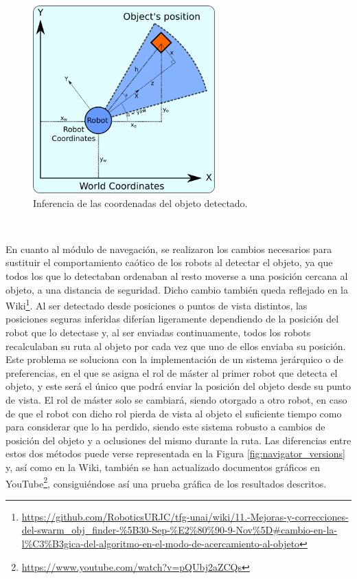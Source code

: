\begin{figure} [h!]
  \begin{center}
    \includegraphics[width=7cm]{figs/coordinates_scheme}
  \end{center}
  \caption{Inferencia de las coordenadas del objeto detectado.}
  \label{fig:coords_infer}
\end{figure}\

En cuanto al módulo de navegación, se realizaron los cambios necesarios para
sustituir el comportamiento caótico de los robots al detectar el objeto, ya que
todos los que lo detectaban ordenaban al resto moverse a una posición cercana al
objeto, a una distancia de seguridad.
Dicho cambio también queda reflejado en la Wiki\footnote{
\url{https://github.com/RoboticsURJC/tfg-unai/wiki/11.-Mejoras-y-correcciones-del-swarm\_obj\_finder-\%5B30-Sep-\%E2\%80\%90-9-Nov\%5D\#cambio-en-la-l\%C3\%B3gica-del-algoritmo-en-el-modo-de-acercamiento-al-objeto}}.
Al ser detectado desde posiciones o puntos de vista distintos, las posiciones
seguras inferidas diferían ligeramente dependiendo de la posición del robot que
lo detectase y, al ser enviadas continuamente, todos los robots recalculaban su
ruta al objeto por cada vez que uno de ellos enviaba su posición.
\\

Este problema se soluciona con la implementación de un sistema jerárquico o de
preferencias, en el que se asigna el rol de máster al primer robot que detecta
el objeto, y este será el único que podrá enviar la posición del objeto desde su
punto de vista.
El rol de máster solo se cambiará, siendo otorgado a otro robot, en caso de que
el robot con dicho rol pierda de vista al objeto el suficiente tiempo como para
considerar que lo ha perdido, siendo este sistema robusto a cambios de posición
del objeto y a oclusiones del mismo durante la ruta.
Las diferencias entre estos dos métodos puede verse representada en la Figura
\ref{fig:navigator_versions} y, así como en la Wiki, también se han actualizado
documentos gráficos en YouTube\footnote{
\url{https://www.youtube.com/watch?v=pQUbj2aZCQs}}, consiguiéndose así una
prueba gráfica de los resultados descritos.
\\


